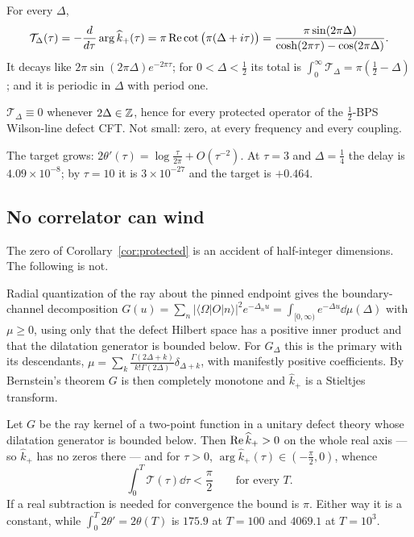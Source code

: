\begin{proposition}\label{prop:defectdelay}
For every $\Delta$,
\[
 \mathcal T_\Delta(\tau)=-\frac{d}{d\tau}\arg\widehat k_+(\tau)
 =\pi\operatorname{Re}\cot\big(\pi(\Delta+i\tau)\big)
 =\frac{\pi\sin(2\pi\Delta)}{\cosh(2\pi\tau)-\cos(2\pi\Delta)} .
\]
It decays like $2\pi\sin(2\pi\Delta)e^{-2\pi\tau}$; for $0<\Delta<\frac12$ its
total is $\int_0^\infty\mathcal T_\Delta=\pi(\frac12-\Delta)$; and it is periodic
in $\Delta$ with period one.
\end{proposition}

\begin{corollary}\label{cor:protected}
$\mathcal T_\Delta\equiv0$ whenever $2\Delta\in\mathbb Z$, hence for every protected
operator of the $\frac12$-BPS Wilson-line defect CFT. Not small: zero, at every
frequency and every coupling.
\end{corollary}

The target grows: $2\theta'(\tau)=\log\frac\tau{2\pi}+O(\tau^{-2})$. At $\tau=3$
and $\Delta=\frac14$ the delay is $4.09\times10^{-8}$; by $\tau=10$ it is
$3\times10^{-27}$ and the target is $+0.464$.

\subsection{No correlator can wind}

The zero of Corollary~\ref{cor:protected} is an accident of half-integer
dimensions. The following is not.

Radial quantization of the ray about the pinned endpoint gives the
boundary-channel decomposition
$G(u)=\sum_n|\langle\Omega|O|n\rangle|^2e^{-\Delta_nu}=\int_{[0,\infty)}e^{-\Delta
u}\dd\mu(\Delta)$ with $\mu\geq0$, using only that the defect Hilbert space has a
positive inner product and that the dilatation generator is bounded below. For
$G_\Delta$ this is the primary with its descendants,
$\mu=\sum_k\frac{\Gamma(2\Delta+k)}{k!\Gamma(2\Delta)}\delta_{\Delta+k}$, with
manifestly positive coefficients. By Bernstein's theorem $G$ is then completely
monotone and $\widehat k_+$ is a Stieltjes transform.

\begin{proposition}[No winding]\label{prop:nowinding}
Let $G$ be the ray kernel of a two-point function in a unitary defect theory whose
dilatation generator is bounded below. Then $\operatorname{Re}\widehat k_+>0$ on the whole real
axis --- so $\widehat k_+$ has no zeros there --- and for $\tau>0$,
$\arg\widehat k_+(\tau)\in(-\frac\pi2,0)$, whence
\[
 \int_0^T\mathcal T(\tau)\dd\tau<\frac\pi2\qquad\text{for every }T .
\]
If a real subtraction is needed for convergence the bound is $\pi$. Either way it
is a constant, while $\int_0^T2\theta'=2\theta(T)$ is $175.9$ at $T=100$ and
$4069.1$ at $T=10^3$.
\end{proposition}

